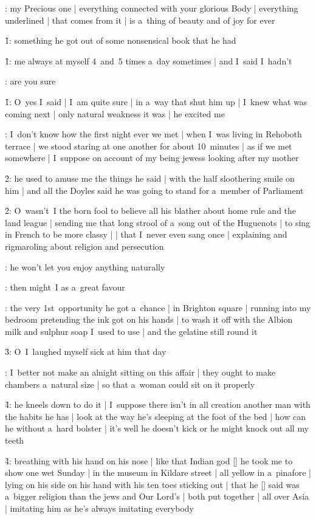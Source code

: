 :
my Precious one |
everything connected with your glorious Body |
everything underlined |
that comes from it |
is a~thing of beauty and of joy for ever

\f1:
something he got out of some nonsensical book that he had

\f1:
me always at myself 4~and~5 times a~day sometimes |
and I~said I~hadn't

:
are you sure

\f1:
O~yes I~said |
I~am quite sure |
in a~way that shut him up |
I~knew what was coming next |
only natural weakness it was |
he excited me

:
I~don't know how the first night ever we met |
when I~was living in Rehoboth terrace |
we stood staring at one another for about 10~minutes |
as if we met somewhere |
I~suppose on account of my being jewess looking after my mother

\f2:
he used to amuse me the things he said |
with the half sloothering smile on him |
and all the Doyles said he was going to stand for a~member of Parliament

\f2:
O~wasn't~I the born fool
to believe all his blather about home rule and the land league |
sending me that long strool of a~song out of the Huguenots |
to sing in French to be more classy |
 |
that I~never even sang once |
explaining and rigmaroling about religion and persecution

:
he won't let you enjoy anything naturally

:
then might~I as a~great favour

:
the very 1st~opportunity he got a~chance |
in Brighton square |
running into my bedroom pretending the ink got on his hands |
to wash it off with the Albion milk and sulphur soap I~used to use |
and the gelatine still round it

\f3:
O~I~laughed myself sick at him that day

:
I~better not make an alnight sitting on this affair |
they ought to make chambers a~natural size |
so that a~woman could sit on it properly

\f4:
he kneels down to do it |
I~suppose there isn't in all creation another man with the habits he has |
look at the way he's sleeping at the foot of the bed |
how can he without a~hard bolster |
it's well he doesn't kick
or he might knock out all my teeth

\f4:
breathing with his hand on his nose |
like that Indian god [\buddha] he took me to show one wet Sunday |
in the museum in Kildare street |
all yellow in a~pinafore |
lying on his side on his hand with his ten toes sticking out |
that he [\bloom] said was a~bigger religion
than the jews and Our Lord's |
both put together |
all over Asia |
imitating him as he's always imitating everybody

